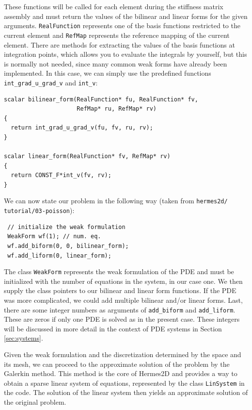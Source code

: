 \documentclass[11pt]{article}
\begin{document}
These functions will be called for each element during the stiffness matrix
assembly and must return the values of the bilinear and linear forms for the given arguments.
{\tt RealFunction} represents one of the basis functions restricted to the
current element and {\tt RefMap} represents the reference mapping of the current element.
There are methods for extracting the values of the basis functions at integration points,
which allows you to evaluate the integrals by yourself, but this is normally not needed,
since many common weak forms have already been implemented.
In this case, we can simply use the predefined functions
\verb"int_grad_u_grad_v" and \verb"int_v":

\begin{lstlisting}
scalar bilinear_form(RealFunction* fu, RealFunction* fv,
                     RefMap* ru, RefMap* rv)
{
  return int_grad_u_grad_v(fu, fv, ru, rv);
}

scalar linear_form(RealFunction* fv, RefMap* rv)
{
  return CONST_F*int_v(fv, rv);
}
\end{lstlisting}


We can now state our problem in the following way
(taken from {\tt hermes2d/ tutorial/03-poisson}):

\begin{lstlisting}
 // initialize the weak formulation
 WeakForm wf(1); // num. eq.
 wf.add_biform(0, 0, bilinear_form);
 wf.add_liform(0, linear_form);
\end{lstlisting}

The class {\tt WeakForm} represents the weak formulation of the PDE and must be
initialized with the number of equations in the system, in our case one. We then
supply the class pointers to our bilinear and linear form functions. If the PDE
was more complicated, we could add multiple bilinear and/or linear forms. Last,
there are some integer numbers as arguments of {\tt add\_biform} and {\tt add\_liform}.
These are zeros if only one PDE is solved as in the present case. These integers will be
discussed in more detail in the context of PDE systems in Section \ref{sec:systems}.

Given the weak formulation and the discretization determined by the space and its mesh,
we can proceed to the approximate solution of the problem by the Galerkin method.
This method is the core of Hermes2D and provides a way to obtain a sparse linear
system of equations, represented by the class {\tt LinSystem} in the code. The solution
of the linear system then yields an approximate solution of the original problem.
\end{document}
